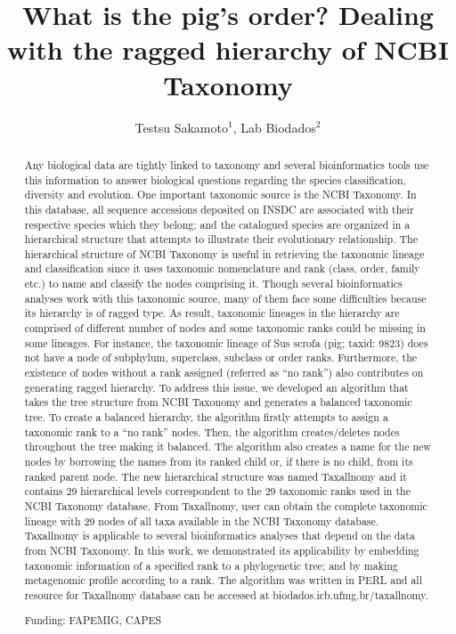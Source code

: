 \documentclass[twoside]{article}
\title{\vspace{-15mm}\fontsize{24pt}{10pt}\selectfont\textbf{What is the pig's order? Dealing with the ragged hierarchy of NCBI Taxonomy}} %
\author{Testsu Sakamoto$^1$, Lab Biodados$^2$}
\affil{1 UFMG. LABORAT\'ORIO DE BIODADOS.\\ 2 UFMG\\ }
\date{}
\begin{document}
\maketitle %

\thispagestyle{fancy} %


\begin{abstract}
Any biological data are tightly linked to taxonomy and several bioinformatics tools use this information to answer biological questions regarding the species classification, diversity and evolution. One important taxonomic source is the NCBI Taxonomy. In this database, all sequence accessions deposited on INSDC are associated with their respective species which they belong; and the catalogued species are organized in a hierarchical structure that attempts to illustrate their evolutionary relationship. The hierarchical structure of NCBI Taxonomy is useful in retrieving the taxonomic lineage and classification since it uses taxonomic nomenclature and rank (class, order, family etc.) to name and classify the nodes comprising it. Though several bioinformatics analyses work with this taxonomic source, many of them face some difficulties because its hierarchy is of ragged type. As result, taxonomic lineages in the hierarchy are comprised of different number of nodes and some taxonomic ranks could be missing in some lineages. For instance, the taxonomic lineage of Sus scrofa (pig; taxid: 9823) does not have a node of subphylum, superclass, subclass or order ranks. Furthermore, the existence of nodes without a rank assigned (referred as ``no rank'') also contributes on generating ragged hierarchy. To address this issue, we developed an algorithm that takes the tree structure from NCBI Taxonomy and generates a balanced taxonomic tree. To create a balanced hierarchy, the algorithm firstly attempts to assign a taxonomic rank to a ``no rank'' nodes. Then, the algorithm creates/deletes nodes throughout the tree making it balanced. The algorithm also creates a name for the new nodes by borrowing the names from its ranked child or, if there is no child, from its ranked parent node. The new hierarchical structure was named Taxallnomy and it contains 29 hierarchical levels correspondent to the 29 taxonomic ranks used in the NCBI Taxonomy database. From Taxallnomy, user can obtain the complete taxonomic lineage with 29 nodes of all taxa available in the NCBI Taxonomy database. Taxallnomy is applicable to several bioinformatics analyses that depend on the data from NCBI Taxonomy. In this work, we demonstrated its applicability by embedding taxonomic information of a specified rank to a phylogenetic tree; and by making metagenomic profile according to a rank. The algorithm was written in PERL and all resource for Taxallnomy database can be accessed at biodados.icb.ufmg.br/taxallnomy.

Funding: FAPEMIG, CAPES
\end{abstract}
\end{document}
